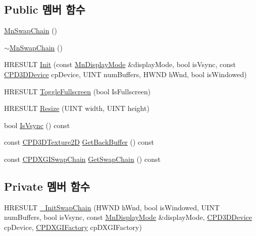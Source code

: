 \subsection*{Public 멤버 함수}
\begin{DoxyCompactItemize}
\item 
\hyperlink{class_m_n_l_1_1_mn_swap_chain_a98d9d1ab6266a71560c4797071813e24}{Mn\+Swap\+Chain} ()
\item 
\hyperlink{class_m_n_l_1_1_mn_swap_chain_a370e63efb36c734f501579499e419290}{$\sim$\+Mn\+Swap\+Chain} ()
\item 
H\+R\+E\+S\+U\+LT \hyperlink{class_m_n_l_1_1_mn_swap_chain_a169ea7905717fe2f804588101a17632d}{Init} (const \hyperlink{struct_m_n_l_1_1_mn_display_mode}{Mn\+Display\+Mode} \&display\+Mode, bool is\+Vsync, const \hyperlink{namespace_m_n_l_a1eec210db8f309a4a9ac0d9658784c31}{C\+P\+D3\+D\+Device} cp\+Device, U\+I\+NT num\+Buffers, H\+W\+ND h\+Wnd, bool is\+Windowed)
\item 
H\+R\+E\+S\+U\+LT \hyperlink{class_m_n_l_1_1_mn_swap_chain_adb1a715131065d8966ed2dc5e70f3f8c}{Toggle\+Fullscreen} (bool Is\+Fullscreen)
\item 
H\+R\+E\+S\+U\+LT \hyperlink{class_m_n_l_1_1_mn_swap_chain_a446289287507e85585146834f13c5b76}{Resize} (U\+I\+NT width, U\+I\+NT height)
\item 
bool \hyperlink{class_m_n_l_1_1_mn_swap_chain_ae81b83e544f6d3e10f6f2801dad88312}{Is\+Vsync} () const
\item 
const \hyperlink{namespace_m_n_l_addb538e1cbd1f443e6db5e6312487c51}{C\+P\+D3\+D\+Texture2D} \hyperlink{class_m_n_l_1_1_mn_swap_chain_a30e822e1b06f07a89dcab11412213cc6}{Get\+Back\+Buffer} () const
\item 
const \hyperlink{namespace_m_n_l_a5e8905e111c1a9d829a86fc3cc3420ec}{C\+P\+D\+X\+G\+I\+Swap\+Chain} \hyperlink{class_m_n_l_1_1_mn_swap_chain_a4f5d743bd05412d3cb7a1e7bd19c8d97}{Get\+Swap\+Chain} () const
\end{DoxyCompactItemize}
\subsection*{Private 멤버 함수}
\begin{DoxyCompactItemize}
\item 
H\+R\+E\+S\+U\+LT \hyperlink{class_m_n_l_1_1_mn_swap_chain_a65a6275867f83674145948dfd9fc2e9f}{\+\_\+\+Init\+Swap\+Chain} (H\+W\+ND h\+Wnd, bool is\+Windowed, U\+I\+NT num\+Buffers, bool is\+Vsync, const \hyperlink{struct_m_n_l_1_1_mn_display_mode}{Mn\+Display\+Mode} \&display\+Mode, \hyperlink{namespace_m_n_l_a1eec210db8f309a4a9ac0d9658784c31}{C\+P\+D3\+D\+Device} cp\+Device, \hyperlink{namespace_m_n_l_a8bb070ff80c5e3a874d942fbc31c22ab}{C\+P\+D\+X\+G\+I\+Factory} cp\+D\+X\+G\+I\+Factory)
\end{DoxyCompactItemize}
